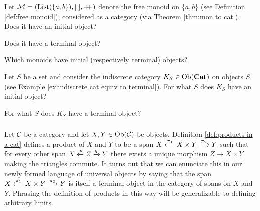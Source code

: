 \documentclass[CT4S-EN-RU]{subfiles}
\begin{document}
\begin{exerciseENG}
Let $\mathcal{M}=(\textnormal{List}(\{a,b\}),[\;],+\!\!+\hspace{1pt})$ denote the free monoid on $\{a,b\}$ (see Definition \ref{def:free monoid}), considered as a category (via Theorem \ref{thm:mon to cat}).
\sexc Does it have an initial object?
\item Does it have a terminal object?
\item Which monoids have initial (respectively terminal) objects?
\endsexc
\end{exerciseENG}

\begin{exerciseRUS}
\end{exerciseRUS}

\begin{exerciseENG}
Let $S$ be a set and consider the indiscrete category $K_S\in\textnormal{Ob}({\mathbf{Cat}})$ on objects $S$ (see Example \ref{ex:indiscrete cat equiv to terminal}).
\sexc For what $S$ does $K_S$ have an initial object?
\item For what $S$ does $K_S$ have a terminal object?
\endsexc
\end{exerciseENG}

\begin{exerciseRUS}
\end{exerciseRUS}


\subsubsection{}\label{sec:examples of limits}

\begin{blockENG}
Let $\mathcal{C}$ be a category and let $X,Y\in\textnormal{Ob}(\mathcal{C})$ be objects. Definition \ref{def:products in a cat} defines a product  of $X$ and $Y$ to be a span $X\xleftarrow{\pi_1}X\times Y\xrightarrow{\pi_2}Y$ such that for every other span $X\xleftarrow{p}Z\xrightarrow{q}Y$ there exists a unique morphism $Z\to X\times Y$ making the triangles commute. It turns out that we can enunciate this in our newly formed language of universal objects by saying that the span $X\xleftarrow{\pi_1}X\times Y\xrightarrow{\pi_2}Y$ is itself a terminal object in the category of spans on $X$ and $Y$. Phrasing the definition of products in this way will be generalizable to defining arbitrary limits.
\end{blockENG}

\begin{blockRUS}
\end{blockRUS}
\end{document}
